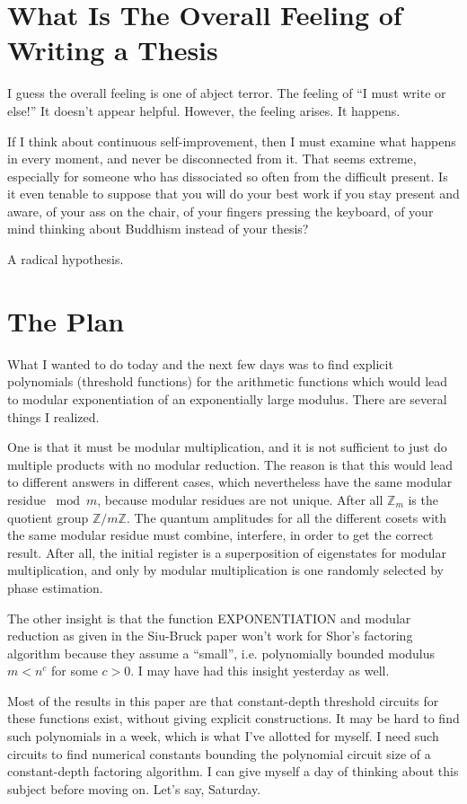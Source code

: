 \documentclass{article}
\begin{document}
\section{What Is The Overall Feeling of Writing a Thesis}

I guess the overall feeling is one of abject terror. The feeling of
``I must write or else!'' It doesn't appear helpful. However, the
feeling arises. It happens.

If I think about continuous self-improvement, then I must examine
what happens in every moment, and never be disconnected from it.
That seems extreme, especially for someone who has dissociated so
often from the difficult present. Is it even tenable to suppose
that you will do your best work if you stay present and aware,
of your ass on the chair, of your fingers pressing the keyboard,
of your mind thinking about Buddhism instead of your thesis?

A radical hypothesis.

\section{The Plan}

What I wanted to do today and the next few days was to find explicit
polynomials (threshold functions) for the arithmetic functions
which would lead to modular exponentiation of an exponentially large
modulus. There are several things I realized.

One is that it must be modular multiplication, and it is not sufficient
to just do multiple products with no modular reduction. The reason is
that this would lead to different answers in different cases, which
nevertheless have the same modular residue $\bmod m$, because
modular residues are not unique. After all $\mathbb{Z}_m$ is the quotient
group $\mathbb{Z}/m\mathbb{Z}$. The quantum amplitudes for all the
different cosets with the same modular residue must combine, interfere,
in order to get the correct result. After all, the initial register is
a superposition of eigenstates for modular multiplication, and only by
modular multiplication is one randomly selected by phase estimation.

The other insight is that the function EXPONENTIATION and modular reduction
as given in the Siu-Bruck paper won't work for Shor's factoring algorithm
because they assume a ``small'', i.e. polynomially bounded modulus
$m < n^c$ for some $c>0$. I may have had this insight yesterday as well.

Most of the results in this paper are that constant-depth threshold
circuits for these functions exist, without giving explicit constructions.
It may be hard to find such polynomials in a week, which is what I've allotted for myself. I need such circuits to find numerical constants
bounding the polynomial circuit size of a constant-depth factoring
algorithm. I can give myself a day of thinking about this subject before
moving on. Let's say, Saturday.
\end{document}
